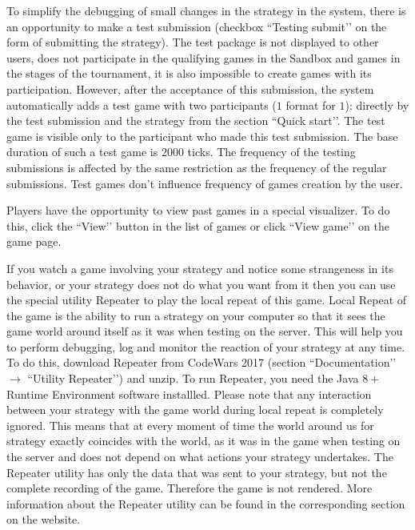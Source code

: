 To simplify the debugging of small changes in the strategy in the system, there is an opportunity to make a test submission (checkbox ``Testing submit’’
on the form of submitting the strategy). The test package is not displayed to other users, does not participate in the qualifying games in the Sandbox and
games in the stages of the tournament, it is also impossible to create games with its participation. However, after the acceptance of this submission, the system
automatically adds a test game with two participants ($1$ format for $1$): directly by the test submission and the strategy from the section
``Quick start’’. The test game is visible only to the participant who made this test submission. The base duration of such a test game
is $2000$ ticks. The frequency of the testing submissions is affected by the same restriction as the frequency of the regular submissions. Test games don’t influence frequency
of games creation by the user.

Players have the opportunity to view past games in a special visualizer. To do this, click the ``View’’ button in the list of games
or click ``View game’’ on the game page.

If you watch a game involving your strategy and notice some strangeness in its behavior, or your strategy does not do what you want from it
then you can use the special utility Repeater to play the local repeat of this game. Local Repeat
of the game is the ability to run a strategy on your computer so that it sees the game world around itself as it was when
testing on the server. This will help you to perform debugging, log and monitor the reaction of your strategy at any time. To do this, download Repeater from CodeWars 2017 (section ``Documentation’’ $\rightarrow$ ``Utility Repeater’’) and unzip.
To run Repeater, you need the Java $8+$ Runtime Environment software installled. Please note that any interaction between your
strategy with the game world during local repeat is completely ignored. This means that at every moment of time the world around us
for strategy exactly coincides with the world, as it was in the game when testing on the server and does not depend on what actions your strategy
undertakes. The Repeater utility has only the data that was sent to your strategy, but not the complete recording of the game. Therefore
the game is not rendered. More information about the Repeater utility can be found in the corresponding section on the website.

